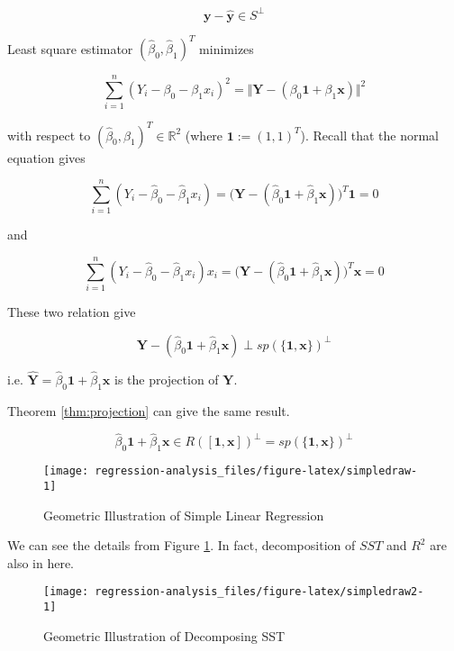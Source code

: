 \documentclass[]{book}
\theoremstyle{definition}
\theoremstyle{definition}
\theoremstyle{definition}
\theoremstyle{remark}
\begin{document}
\[\mathbf{y} - \mathbf{\hat{y}} \in S^{\perp}\]

Least square estimator \((\hat\beta_0, \hat\beta_1)^T\) minimizes

\[\sum_{i = 1}^n (Y_i - \beta_0 - \beta_1 x_i)^2 = \Vert \mathbf{Y} - (\beta_0 \mathbf{1} + \beta_1 \mathbf{x}) \Vert^2\]

with respect to \((\hat\beta_0, \hat\beta_1)^T \in \mathbb{R}^2\) (where
\(\mathbf{1} := (1, 1)^T\)). Recall that the normal equation gives

\[\sum_{i = 1}^n(Y_i - \hat\beta_0 - \hat\beta_1 x_i) = \Big( \mathbf{Y} - (\hat\beta_0 \mathbf{1} + \hat\beta_1 \mathbf{x}) \Big)^T \mathbf{1} = 0\]

and

\[\sum_{i = 1}^n (Y_i - \hat\beta_0 - \hat\beta_1 x_i)x_i = \Big( \mathbf{Y} - (\hat\beta_0 \mathbf{1} + \hat\beta_1 \mathbf{x}) \Big)^T \mathbf{x} = 0\]

These two relation give

\[\mathbf{Y} - (\hat\beta_0 \mathbf{1} + \hat\beta_1 \mathbf{x}) \perp sp(\{ \mathbf{1}, \mathbf{x} \})^{\perp}\]

i.e.
\(\mathbf{\hat{Y}} = \hat\beta_0 \mathbf{1} + \hat\beta_1 \mathbf{x}\)
is the projection of \(\mathbf{Y}\).

Theorem \ref{thm:projection} can give the same result.

\[\hat\beta_0 \mathbf{1} + \hat\beta_1 \mathbf{x} \in R([\mathbf{1}, \mathbf{x}])^{\perp} = sp(\{ \mathbf{1}, \mathbf{x} \})^{\perp}\]

\begin{figure}[H]

{\centering \texttt{[image: regression-analysis\_files/figure-latex/simpledraw-1]} 

}

\caption{Geometric Illustration of Simple Linear Regression}\label{fig:simpledraw}
\end{figure}

We can see the details from Figure \ref{fig:simpledraw}. In fact,
decomposition of \(SST\) and \(R^2\) are also in here.

\begin{figure}[H]

{\centering \texttt{[image: regression-analysis\_files/figure-latex/simpledraw2-1]} 

}

\caption{Geometric Illustration of Decomposing SST}\label{fig:simpledraw2}
\end{figure}
\end{document}
